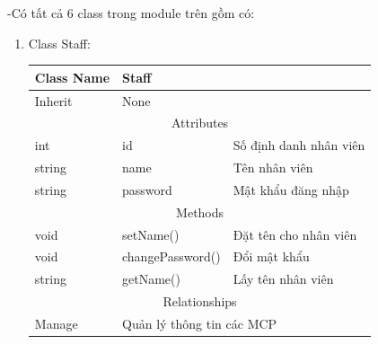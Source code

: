     \newpage
    -Có tất cả 6 class trong module trên gồm có:
    \begin{enumerate}
        \item Class Staff:
        \begin{table}[htp]
            \begin{tabular}{|lll|}
                \hline
                \multicolumn{1}{|l|}{Class Name} & \multicolumn{2}{l|}{Staff}                                     \\ \hline
                \multicolumn{1}{|l|}{Inherit}    & \multicolumn{2}{l|}{None}                                      \\ \hline
                \multicolumn{3}{|c|}{\cellcolor[HTML]{FFFFC7}Attributes}                                          \\ \hline
                \multicolumn{1}{|l|}{int}        & \multicolumn{1}{l|}{id}               & Số định danh nhân viên \\ \hline
                \multicolumn{1}{|l|}{string}     & \multicolumn{1}{l|}{name}             & Tên nhân viên          \\ \hline
                \multicolumn{1}{|l|}{string}     & \multicolumn{1}{l|}{password}         & Mật khẩu đăng nhập     \\ \hline
                \multicolumn{3}{|c|}{\cellcolor[HTML]{FFFFC7}Methods}                                             \\ \hline
                \multicolumn{1}{|l|}{void}       & \multicolumn{1}{l|}{setName()}        & Đặt tên cho nhân viên  \\ \hline
                \multicolumn{1}{|l|}{void}       & \multicolumn{1}{l|}{changePassword()} & Đổi mật khẩu           \\ \hline
                \multicolumn{1}{|l|}{string}     & \multicolumn{1}{l|}{getName()}        & Lấy tên nhân viên      \\ \hline
                \multicolumn{3}{|c|}{\cellcolor[HTML]{FFFFC7}Relationships}                                       \\ \hline
                \multicolumn{1}{|l|}{Manage}     & \multicolumn{2}{l|}{Quản lý thông tin các MCP}                 \\ \hline
            \end{tabular}
        \end{table}
               

\end{enumerate}
